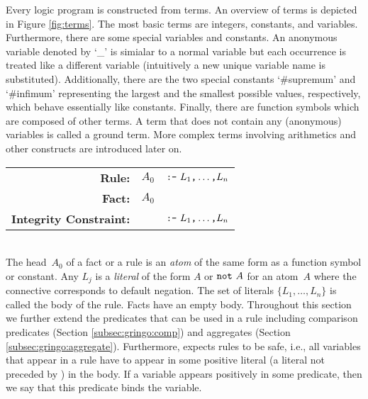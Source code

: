 Every logic program is constructed from terms.
An overview of \gringo{} terms is depicted in Figure \ref{fig:terms}.
The most basic terms are integers, constants, and variables.
Furthermore, there are some special variables and constants.
An anonymous variable denoted by `\_' is simialar to a normal variable 
but each occurrence is treated like a different variable 
(intuitively a new unique variable name is substituted).
Additionally, there are the two special constants `\#supremum' and `\#infimum'
representing the largest and the smallest possible values, respectively,
which behave essentially like constants.
Finally, there are function symbols which are composed of other terms.
A term that does not contain any (anonymous) variables is called a ground term.
More complex terms involving arithmetics and other constructs
are introduced later on.

\begin{tabular}{rl@{}l}\label{eq:normal:rule}
\textbf{Rule:} & $A_0$& $\texttt{:-}~L_1\texttt{,}\dots\texttt{,}L_n$\code{.}
\\
\textbf{Fact:} & $A_0$&\code{.}
\\
\textbf{Integrity Constraint:} & & $\texttt{:-}~L_1\texttt{,}\dots\texttt{,}L_n$\code{.}
\end{tabular}
\\

\noindent
The head~$A_0$ of a fact or a rule is an \emph{atom} of the same form
as a function symbol or constant.
Any $L_j$ is a \emph{literal} of the form $A$ or $\texttt{not}~A$
for an atom~$A$ where the connective  corresponds to default negation.
The set of literals $\{L_1,\dots,L_n\}$ is called the body of the rule.
Facts have an empty body.
Throughout this section we further extend the predicates that can be used 
in a rule including comparison predicates (Section \ref{subsec:gringo:comp}) and aggregates (Section \ref{subsec:gringo:aggregate}).
Furthermore, \gringo{} expects rules to be safe, i.e., 
all variables that appear in a rule have to appear in some positive literal (a literal not preceded by ) in the body.
If a variable appears positively in some predicate, then we say that this predicate binds the variable.

